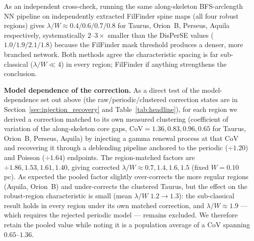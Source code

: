 \documentclass[usenatbib,twoside,twocolumn]{mnras}
\begin{document}
As an independent cross-check, running the same along-skeleton BFS-arclength NN pipeline on independently extracted FilFinder spine maps (all four robust regions) gives $\lambda/W\approx0.4/0.6/0.7/0.8$ for Taurus, Orion~B, Perseus, Aquila respectively, systematically $2$--$3\times$ smaller than the DisPerSE values ($1.0/1.9/2.1/1.8$) because the FilFinder mask threshold produces a denser, more branched network. Both methods agree the characteristic spacing is far sub-classical ($\lambda/W\ll4$) in every region; FilFinder if anything strengthens the conclusion.

\smallskip\noindent\textbf{Model dependence of the correction.}\label{sec:injection_recovery_model}
As a direct test of the model-dependence set out above (the raw/periodic/clustered correction states are in Section~\ref{sec:injection_recovery} and Table~\ref{tab:headline}), for each region we derived a correction matched to its own measured clustering (coefficient of variation of the along-skeleton core gaps, CoV$=1.36,0.83,0.96,0.65$ for Taurus, Orion~B, Perseus, Aquila) by injecting a gamma renewal process at that CoV and recovering it through a deblending pipeline anchored to the periodic ($\div1.20$) and Poisson ($\div1.64$) endpoints. The region-matched factors are $\div1.86,1.53,1.61,1.40$, giving corrected $\lambda/W\approx0.7,1.4,1.6,1.5$ (fixed $W=0.10$\,pc). As expected the pooled factor slightly over-corrects the more regular regions (Aquila, Orion~B) and under-corrects the clustered Taurus, but the effect on the robust-region characteristic is small (mean $\lambda/W$ $1.2\to1.3$): the sub-classical result holds in every region under its own matched correction, and $\lambda/W\approx1.9$ --- which requires the rejected periodic model --- remains excluded. We therefore retain the pooled value while noting it is a population average of a CoV spanning $0.65$--$1.36$.
\end{document}

